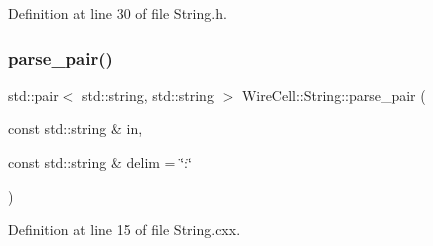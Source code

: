 Definition at line 30 of file String.\+h.

\mbox{\label{namespace_wire_cell_1_1_string_aa275a51c718c16893c21d2a915cab1e6}} 
\subsubsection{\texorpdfstring{parse\+\_\+pair()}{parse\_pair()}}
{\footnotesize\ttfamily std\+::pair$<$ std\+::string, std\+::string $>$ Wire\+Cell\+::\+String\+::parse\+\_\+pair (\begin{DoxyParamCaption}\item[{const std\+::string \&}]{in,  }\item[{const std\+::string \&}]{delim = {\ttfamily \char`\"{}\+:\char`\"{}} }\end{DoxyParamCaption})}



Definition at line 15 of file String.\+cxx.

